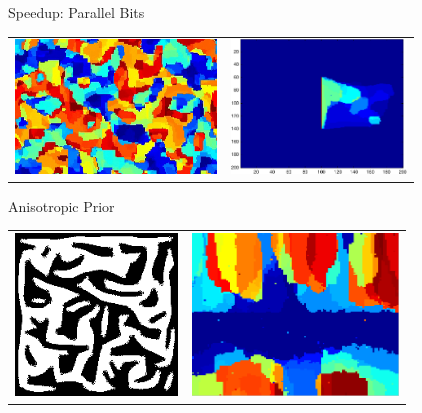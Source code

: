 \addtocounter{framenumber}{-1}
\begin{tframe}{Speedup: Parallel Bits}

\bigskip
\begin{center}
\begin{tabular}{cc}
\includegraphics[height=1.4in]{media_exploration/iso-04}&
\includegraphics[height=1.4in]{media_exploration/par225}
\end{tabular}
\end{center}
\end{tframe}

\begin{tframe}{Anisotropic Prior}

\bigskip
\begin{center}
\begin{tabular}{cc}
\includegraphics[height=1.7in]{media_exploration/angly}&
\includegraphics[height=1.7in]{media_exploration/frame_179}
\end{tabular}
\end{center}
\end{tframe}


